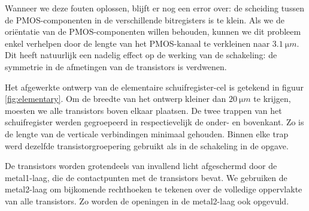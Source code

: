 \documentclass[11pt,a4paper,oneside,dutch]{article}
\begin{document}
Wanneer we deze fouten oplossen, blijft er nog een error over: de scheiding tussen de PMOS-componenten in de verschillende bitregisters is te klein. Als we de oriëntatie van de PMOS-componenten willen behouden, kunnen we dit probleem enkel verhelpen door de lengte van het PMOS-kanaal te verkleinen naar $\SI{3,1}{\micro m}$. Dit heeft natuurlijk een nadelig effect op de werking van de schakeling: de symmetrie in de afmetingen van de transistors is verdwenen.

Het afgewerkte ontwerp van de elementaire schuifregister-cel is getekend in figuur \ref{fig:elementary}. Om de breedte van het ontwerp kleiner dan $\SI{20}{\micro m}$ te krijgen, moesten we alle transistors boven elkaar plaatsen. De twee trappen van het schuifregister werden gegroepeerd in respectievelijk de onder- en bovenkant. Zo is de lengte van de verticale verbindingen minimaal gehouden. Binnen elke trap werd dezelfde transistorgroepering gebruikt als in de schakeling in de opgave.

De transistors worden grotendeels van invallend licht afgeschermd door de metal1-laag, die de contactpunten met de transistors bevat. We gebruiken de metal2-laag om bijkomende rechthoeken te tekenen over de volledige oppervlakte van alle transistors. Zo worden de openingen in de metal2-laag ook opgevuld.
\end{document}
